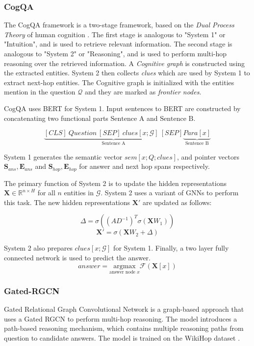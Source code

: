 \documentclass[sigplan,screen,nonacm]{acmart}
\begin{document}
\subsubsection{CogQA}
The CogQA framework \cite{RN118} is a two-stage framework, based on the \emph{Dual Process Theory} of human cognition \cite{RN137}.
The first stage is analogous to "System 1" or "Intuition", and is used to retrieve relevant information. The second stage is analogous to
"System 2" or "Reasoning", and is used to perform multi-hop reasoning over the retrieved information. A \emph{Cognitive graph} is constructed
using the extracted entities. System 2 then collects \emph{clues} which are used by System 1 to extract next-hop entities.
The Cognitive graph is initialized with the entities mention in the question $\mathcal{Q}$ and they are marked as \emph{frontier nodes}.

CogQA uses BERT \cite{RN153} for System 1. Input sentences to BERT are constructed by concatenating two functional parts 
$\text{Sentence A}$ and $\text{Sentence B}$.

$$
\underbrace{{[CLS]\: Question \: [SEP]\: clues[x; \mathcal{G}]\: [SEP]}}_{\text{Sentence A}} \underbrace{{Para[x]}}_{\text{Sentence B}}
$$

System 1 generates the semantic vector $sem[x; Q; clues]$, and pointer vectors 
$\boldsymbol{S}_{ans} , \boldsymbol{E}_{ans} $ and $\boldsymbol{S}_{hop} , \boldsymbol{E}_{hop} $ for answer and next hop spans respectively.

The primary function of System 2 is to update the hidden representations $\boldsymbol{X} \in \mathbb{R}^{n \times H}$ for all $n$ entities 
in $\mathcal{G}$. System 2 uses a variant of GNNs \cite{RN2} to perform this task. The new hidden representations $\boldsymbol{X'}$ are updated 
as follows:

$$
\Delta = \sigma((AD^{-1})^T \sigma (\boldsymbol{X}W_1))
$$
$$
\boldsymbol{X'} = \sigma(\boldsymbol{X}W_2 + \Delta)
$$

System 2 also prepares $clues[x; \mathcal{G}]$ for System 1. Finally, a two layer fully connected network is used to predict the answer.
$$
answer = \underset{\text{answer node }x}{\mathrm{argmax}}  \mathcal{F}(\boldsymbol{X}[x])
$$

\subsubsection{Gated-RGCN}
Gated Relational Graph Convolutional Network \cite{RN91} is a graph-based approach that uses a Gated RGCN to perform multi-hop reasoning.
The model introduces a path-based reasoning mechanism, which contains multiple reasoning paths from question to candidate answers. The model is 
trained on the WikiHop dataset \cite{RN115}.
\end{document}
